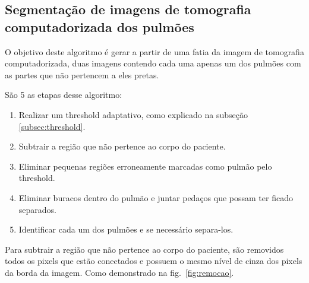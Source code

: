 \subsection{Segmentação de imagens de tomografia computadorizada dos pulmões}

O objetivo deste algoritmo é gerar a partir de uma fatia da imagem de tomografia computadorizada, duas imagens contendo cada uma apenas um dos pulmões com as partes que não pertencem a eles pretas.

São 5 as etapas desse algoritmo:
\begin{enumerate}
 \item Realizar um threshold adaptativo, como explicado na subseção \ref{subsec:threshold}.
 \item Subtrair a região que não pertence ao corpo do paciente.
 \item Eliminar pequenas regiões erroneamente marcadas como pulmão pelo threshold.
 \item Eliminar buracos dentro do pulmão e juntar pedaços que possam ter ficado separados.
 \item Identificar cada um dos pulmões e se necessário separa-los.
\end{enumerate}

Para subtrair a região que não pertence ao corpo do paciente, são removidos todos os pixels que estão conectados e possuem o mesmo nível de cinza dos pixels da borda da imagem. Como demonstrado na fig.~\ref{fig:remocao}.

